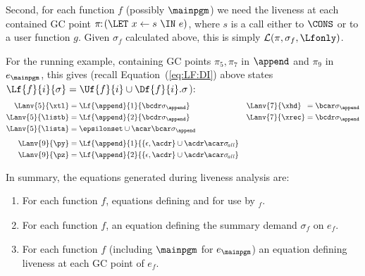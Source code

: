 \documentclass{llncs}
\begin{document}
Second, for each function $f$ (possibly $\mainpgm$) we need the liveness at
each contained GC point
$\pi\!\!:\!(\LET~x \leftarrow s~\IN~e)$,
where $s$ is a call either to $\CONS$ or to a user function $g$.
Given $\sigma_f$ calculated above, this
is simply $\mathcal{L}(\pi,\sigma_f,\Lfonly)$.

For the running example, containing GC points $\pi_5, \pi_7$ in $\append$ and
$\pi_9$ in $e_\mainpgm$, this gives
(recall Equation~(\ref{eq:LF:DI}) above states $\Lf{f}{i}{\sigma} = \Uf{f}{i} \cup \Df{f}{i}.\sigma$):
\begin{align*}
\Lanv{5}{\xtl} &= \Lf{\append}{1}{\bcdr\sigma_{\append}}  \quad &
                                \Lanv{7}{\xhd}\,\,\, &=  \bcar\sigma_{\append}     \\ 
\Lanv{5}{\listb} &= \Lf{\append}{2}{\bcdr\sigma_{\append}} &
                                \Lanv{7}{\xrec} &=  \bcdr\sigma_{\append} \\
\Lanv{5}{\lista} &= \epsilonset \cup \acar\bcar\sigma_{\append} 
\\[1ex]
  \Lanv{9}{\py}  &= \Lf{\append}{1}{\{\epsilon,
    \acdr\} \cup \acdr\acar\sigma_{\mathit{\!all}}} \\
  \Lanv{9}{\pz}  &= \Lf{\append}{2}{\{\epsilon,
    \acdr\} \cup \acdr\acar\sigma_{\mathit{\!all}}}
\end{align*}

\noindent 
In summary, the equations generated during liveness analysis are:
\begin{enumerate}
\item   For    each   function   $\mathit{f}$,    equations   defining
 and  for use by \Lfonly$_{\mathit f}$.
\item  For  each   function  $\mathit{f}$, an  equation  defining
the summary demand  $\sigma_{\mathit f}$ on $e_f$.
\item For each function $\mathit{f}$ (including $\mainpgm$ for $e_\mainpgm$)
an equation defining
  liveness at each GC point of $e_{\mathit f}$.
\end{enumerate}
\end{document}
